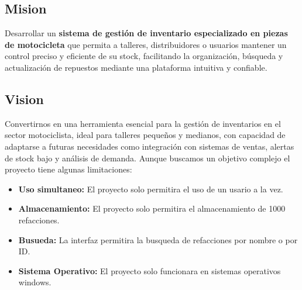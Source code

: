 \subsection*{\centering Mision}
Desarrollar un \textbf{sistema de gestión de inventario especializado en piezas de motocicleta} que permita a talleres,
distribuidores o usuarios mantener un control preciso y eficiente de su stock, 
facilitando la organización, búsqueda y actualización de repuestos mediante una 
plataforma intuitiva y confiable.

\subsection*{\centering Vision}
Convertirnos en una herramienta esencial para la gestión de inventarios en el sector 
motociclista, ideal para talleres pequeños y medianos, 
con capacidad de adaptarse a futuras necesidades como integración con 
sistemas de ventas, alertas de stock bajo y análisis de demanda.
\newline
\newline
Aunque buscamos un objetivo complejo el proyecto tiene algunas limitaciones:

\begin{itemize}
    \item \textbf{Uso simultaneo:} El proyecto solo permitira el uso de un usario a la vez.
    \item \textbf{Almacenamiento:} El proyecto solo permitira el almacenamiento de 1000 refacciones.
    \item \textbf{Busueda:} La interfaz permitira la busqueda de refacciones por nombre o por ID.
    \item \textbf{Sistema Operativo:} El proyecto solo funcionara en sistemas operativos windows.
\end{itemize}